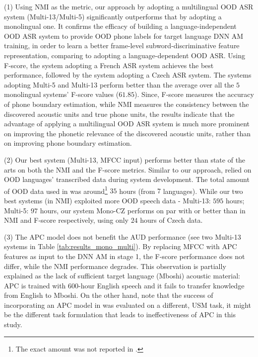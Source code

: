 \documentclass[a4paper]{article}
\begin{document}
(1) Using NMI as the metric, our approach by adopting a multilingual OOD ASR system (Multi-13/Multi-5) significantly outperforms that by adopting a monolingual one. It confirms the efficacy of 
building a language-independent OOD ASR system  to provide OOD phone labels for target language DNN AM training, in order to learn a better frame-level subword-discriminative feature representation, comparing to adopting a language-dependent OOD ASR. Using F-score, the system adopting a French   ASR system achieves the best performance, followed by the system adopting  a Czech ASR system. The systems adopting Multi-5 and Multi-13 perform   better than the average over all the $5$ monolingual systems' F-score values ($61.85$).   Since, F-score measures the accuracy of phone boundary estimation, while NMI measures the consistency between the discovered acoustic units and true phone units, the results indicate that the advantage of applying a multilingual OOD ASR system is much more prominent on improving the phonetic relevance of the discovered acoustic units, rather than on improving phone boundary estimation.  

(2) Our best system (Multi-13, MFCC input) performs better than state of the arts \cite{Yusuf2020hierarchical,Ondel2019Bayesian} on both the NMI and the F-score metrics. Similar to our approach,    \cite{Yusuf2020hierarchical,Ondel2019Bayesian} relied on OOD languages' transcribed data during system development. The total amount of OOD data used in  \cite{Yusuf2020hierarchical,Ondel2019Bayesian} was around\footnote{The exact amount was not reported in \cite{Yusuf2020hierarchical}.} $35$ hours (from $7$ languages). While our two best systems (in NMI) exploited more OOD speech data - Multi-13: $595$ hours; Multi-5: $97$ hours, our system Mono-CZ performs on par with or better than \cite{Yusuf2020hierarchical,Ondel2019Bayesian} in NMI and F-score respectively, using only $24$ hours of Czech data.

(3) The APC model does not benefit the AUD performance (see two Multi-13 systems in Table \ref{tab:results_mono_multi}). By replacing MFCC   with APC features as input to the DNN AM in stage 1, the F-score performance does not differ, while the NMI performance degrades. This observation is partially explained as the lack of sufficient target language (Mboshi) acoustic material: APC is trained with $600$-hour English speech and it fails to transfer knowledge  from English to Mboshi. On the other hand, note that the success of incorporating an APC model in \cite{feng2020unsupervised} was evaluated on a different, USM task, it might be the different task formulation  that leads to ineffectiveness   of APC in this study.
\end{document}
